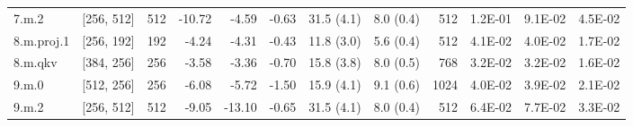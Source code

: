 \begin{table}
\begin{tabular}{llrrrrllrrrr}
7.m.2 & [256, 512] & 512 & {\cellcolor[HTML]{FFF8B4}} \color[HTML]{000000} -10.72 & {\cellcolor[HTML]{F7FCB4}} \color[HTML]{000000} -4.59 & {\cellcolor[HTML]{EBF7A3}} \color[HTML]{000000} -0.63 & 31.5 (4.1) & 8.0 (0.4) & 512 & {\cellcolor[HTML]{FB9D59}} \color[HTML]{000000} 1.2E-01 & {\cellcolor[HTML]{FED481}} \color[HTML]{000000} 9.1E-02 & {\cellcolor[HTML]{F1F9AC}} \color[HTML]{000000} 4.5E-02 \\
8.m.proj.1 & [256, 192] & 192 & {\cellcolor[HTML]{F5FBB2}} \color[HTML]{000000} -4.24 & {\cellcolor[HTML]{F5FBB2}} \color[HTML]{000000} -4.31 & {\cellcolor[HTML]{EBF7A3}} \color[HTML]{000000} -0.43 & 11.8 (3.0) & 5.6 (0.4) & 512 & {\cellcolor[HTML]{ECF7A6}} \color[HTML]{000000} 4.1E-02 & {\cellcolor[HTML]{EBF7A3}} \color[HTML]{000000} 4.0E-02 & {\cellcolor[HTML]{C9E881}} \color[HTML]{000000} 1.7E-02 \\
8.m.qkv & [384, 256] & 256 & {\cellcolor[HTML]{F4FAB0}} \color[HTML]{000000} -3.58 & {\cellcolor[HTML]{F2FAAE}} \color[HTML]{000000} -3.36 & {\cellcolor[HTML]{EBF7A3}} \color[HTML]{000000} -0.70 & 15.8 (3.8) & 8.0 (0.5) & 768 & {\cellcolor[HTML]{E0F295}} \color[HTML]{000000} 3.2E-02 & {\cellcolor[HTML]{E0F295}} \color[HTML]{000000} 3.2E-02 & {\cellcolor[HTML]{C7E77F}} \color[HTML]{000000} 1.6E-02 \\
9.m.0 & [512, 256] & 256 & {\cellcolor[HTML]{FAFDB8}} \color[HTML]{000000} -6.08 & {\cellcolor[HTML]{FAFDB8}} \color[HTML]{000000} -5.72 & {\cellcolor[HTML]{EEF8A8}} \color[HTML]{000000} -1.50 & 15.9 (4.1) & 9.1 (0.6) & 1024 & {\cellcolor[HTML]{EBF7A3}} \color[HTML]{000000} 4.0E-02 & {\cellcolor[HTML]{E9F6A1}} \color[HTML]{000000} 3.9E-02 & {\cellcolor[HTML]{CFEB85}} \color[HTML]{000000} 2.1E-02 \\
9.m.2 & [256, 512] & 512 & {\cellcolor[HTML]{FFFCBA}} \color[HTML]{000000} -9.05 & {\cellcolor[HTML]{FFF3AC}} \color[HTML]{000000} -13.10 & {\cellcolor[HTML]{EBF7A3}} \color[HTML]{000000} -0.65 & 31.5 (4.1) & 8.0 (0.4) & 512 & {\cellcolor[HTML]{FFF6B0}} \color[HTML]{000000} 6.4E-02 & {\cellcolor[HTML]{FEE999}} \color[HTML]{000000} 7.7E-02 & {\cellcolor[HTML]{E2F397}} \color[HTML]{000000} 3.3E-02 \\
\bottomrule
\end{tabular}
\end{table}
